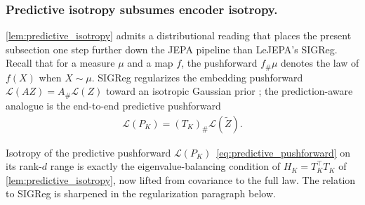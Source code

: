 \subsubsection{Predictive isotropy subsumes encoder isotropy.}
\label{subsubsec:gauge_factorization}
\cref{lem:predictive_isotropy} admits a distributional reading that places the present subsection one step further down the JEPA pipeline than LeJEPA's SIGReg. 
Recall that for a measure $\mu$ and a map $f$, the pushforward $f_\#\mu$ denotes the law of $f(X)$ when $X\sim\mu$. 
SIGReg regularizes the embedding pushforward $\mathcal L(AZ)=A_\#\mathcal L(Z)$ toward an isotropic Gaussian prior \citep{balestriero2025lejepa}; the prediction-aware analogue is the end-to-end predictive pushforward
\begin{align}
    \mathcal L(P_K)=(T_K)_\#\mathcal L(\widetilde Z).
    \label{eq:predictive_pushforward}
\end{align}

\begin{remark}
\label{rem:relation_to_sigreg}
Isotropy of the predictive pushforward $\mathcal L(P_K)$~\eqref{eq:predictive_pushforward} on its rank-$d$ range is exactly the eigenvalue-balancing condition of $H_K=T_K^\top T_K$ of \cref{lem:predictive_isotropy}, now lifted from covariance to the full law. 
The relation to SIGReg is sharpened in the regularization paragraph below.
\end{remark}

